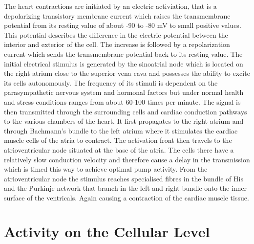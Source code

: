 \documentclass[../draft_1.tex]{subfiles}
\begin{document}
The heart contractions are initiated by an electric activiation, that is a depolarizing transistory membrane current which raises the transmembrane potential from its resting value of about -90 to -80 mV to small positive values. This potential describes the difference in the electric potential between the interior and exterior of the cell. The increase is followed by a repolarization current which sends the transmembrane potential back to its resting value. The initial electrical stimulus is generated by the sinoatrial node which is located on the right atrium close to the superior vena cava and possesses the ability to excite its cells autonomously. The frequency of its stimuli is dependent on the parasympathetic nervous system and hormonal factors but under normal health and stress conditions ranges from about 60-100 times per minute. The signal is then transmitted through the surrounding cells and cardiac conduction pathways to the various chambers of the heart. It first propagates to the right atrium and through Bachmann's bundle to the left atrium where it stimulates the cardiac muscle cells of the atria to contract. The activation front then travels to the atrioventricular node situated at the base of the atria. The cells there have a relatively slow conduction velocity and therefore cause a delay in the transmission which is timed this way to achieve optimal pump activity. From the atrioventricular node the stimulus reaches specialised fibres in the bundle of His and the Purkinje network that branch in the left and right bundle onto the inner surface of the ventricals. Again causing a contraction of the cardiac muscle tissue. 

\section{Activity on the Cellular Level}
\end{document}
